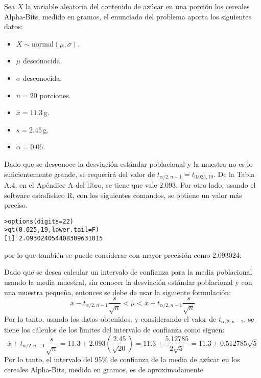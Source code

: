 \begin{solucion}
 Sea $X$ la variable aleatoria del contenido de az\'ucar en una porci\'on los cereales Alpha-Bits, medido en gramos, el enunciado del problema aporta los siguientes datos:
 \begin{itemize}
  \item $X\sim\text{normal}(\mu,\sigma)$.
  \item $\mu$ desconocida.
  \item $\sigma$ desconocida.
  \item $n=20$ porciones.
  \item $\bar{x}=11.3\,$g.
  \item $s=2.45\,$g.
  \item $\alpha=0.05$.
 \end{itemize}
 Dado que se desconoce la desviaci\'on est\'andar poblacional y la muestra no es lo suficientemente grande, se requerir\'a del valor de $t_{\alpha/2,n-1} = t_{0.025,19}$. De la Tabla A.4, en el Ap\'endice A del libro, se tiene que vale $2.093$. Por otro lado, usando el software estad\'{\i}stico R, con los siguientes comandos, se obtiene un valor m\'as preciso.
 \begin{verbatim}
>options(digits=22)
>qt(0.025,19,lower.tail=F)
[1] 2.093024054408309631015
 \end{verbatim}
 \vspace{-0.5cm}
 por lo que tambi\'en se puede considerar con mayor precisi\'on como $2.093024$.
 \par 
 Dado que se desea calcular un intervalo de confianza para la media poblacional usando la media muestral, sin conocer la desviaci\'on est\'andar poblacional y con una muestra peque\~na, entonces se debe de usar la siguiente formulaci\'on:
 \begin{equation*}
  \bar{x}-t_{\alpha/2,n-1}\frac{s}{\sqrt{n}} < \mu < \bar{x}+t_{\alpha/2,n-1}\frac{s}{\sqrt{n}}
 \end{equation*}
 Por lo tanto, usando los datos obtenidos, y considerando el valor de $t_{\alpha/2,n-1}$, se tiene los c\'alculos de los l\'{\i}mites del intervalo de confianza como siguen:
 \begin{equation*}
  \bar{x}\pm t_{\alpha/2,n-1}\frac{s}{\sqrt{n}} = 11.3\pm 2.093\left( \frac{2.45}{\sqrt{20}} \right) =11.3\pm\frac{5.12785}{2\sqrt{5}} =11.3\pm 0.512785\sqrt{5}
 \end{equation*}
 Por lo tanto, el intervalo del $95\%$ de confianza de la media de az\'ucar en los cereales Alpha-Bits, medida en gramos, es de aproximadamente

\end{solucion}
